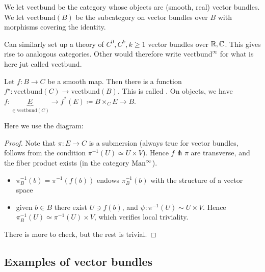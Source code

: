 \begin{definition*}
    We let \(\text{vectbund}\) be the category whose objects are (smooth, real) vector bundles. We 
    let \(\text{vectbund}(B)\) be the subcategory on vector bundles over \(B\) with morphisms covering the 
    identity.
\end{definition*}

\begin{remark}
    Can similarly set up a theory of \(C^0,C^k,k\geq 1\) vector bundles over \(\mathbb{R},\mathbb{C}\). This gives rise to 
    analogous categories. Other would therefore write \(\text{vectbund}^\infty\) for what is here jut called \(\text{vectbund}\). 
\end{remark}

\begin{lemma}[Construction]\label{lem:8.2}
    Let \(f:B\to C\) be a smooth map. Then there is a function \(f^\star:\text{vectbund}(C)\to \text{vectbund}(B)\).
    This is called . On objects, we have \(f:\underbrace{E}_{\in \text{vectbund}(C)}\to f^*(E)\coloneqq B\times_C E \to B\).
\end{lemma}
 Here we use the diagram: 
\begin{center}
\end{center}

\begin{proof}
    Note that \(\pi:E\to C\) is a submersion (always true for vector bundles, follows from the condition \(\pi^{-1}(U)\simeq U\times V\)).
    Hence \(f \pitchfork\pi\)
    are transverse, and the fiber product exists (in the category \(\text{Man}^\infty\)).
    \begin{itemize}
        \item \(\pi_B^{-1}(b)=\pi^{-1}(f(b))\) endows \(\pi_B^{-1}(b)\) with the structure of a vector space
        \item given \(b\in B\) there exist \(U\ni f(b)\), and \(\psi:\pi^{-1}(U)\sim U\times V\). Hence \(\pi_B^{-1}(U)\simeq \pi^{-1}(U)\times V\), which verifies local triviality.
    \end{itemize}

    There is more to check, but the rest is trivial.
\end{proof}

\subsection{Examples of vector bundles}

